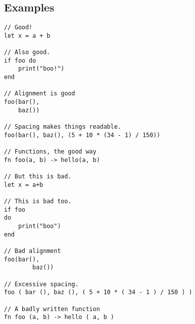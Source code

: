 \documentclass{article}
\begin{document}
\subsection{Examples}
\begin{lstlisting}[language=vortex]
// Good!
let x = a + b

// Also good.
if foo do
    print("boo!")
end

// Alignment is good
foo(bar(),
    baz())

// Spacing makes things readable.
foo(bar(), baz(), (5 + 10 * (34 - 1) / 150))

// Functions, the good way
fn foo(a, b) -> hello(a, b)

// But this is bad.
let x = a+b

// This is bad too.
if foo
do
    print("boo")
end

// Bad alignment
foo(bar(),
        baz())

// Excessive spacing.
foo ( bar (), baz (), ( 5 + 10 * ( 34 - 1 ) / 150 ) )

// A badly written function
fn foo (a, b) -> hello ( a, b )
\end{lstlisting}
\end{document}
